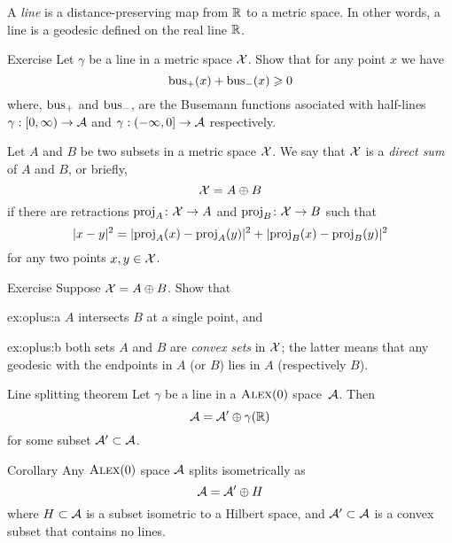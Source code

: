 A \emph{line} is a distance-preserving map
from $\RR$ to a metric space.
In other words, a line is a geodesic defined on the real line $\RR$.

\begin{thm}[!]{Exercise}\label{ex:bus+bus}
Let $\gamma$ be a line in a metric space $\spc{X}$.
Show that for any point $x$ we have
\[\bus_+(x)+\bus_-(x)\ge 0\]
where, $\bus_+$ and $\bus_-$, are the Busemann functions asociated with half-lines $\gamma:[0,\infty)\to \spc{A}$ and $\gamma:(-\infty,0]\to \spc{A}$ respectively.
\end{thm}


Let $A$ and $B$ be two subsets in a metric space $\spc{X}$.
We say that $\spc{X}$ is a \emph{direct sum} of $A$ and $B$,
or briefly,
\[\spc{X}=A\oplus B\]
if there are retractions $\proj_A\:\spc{X}\to A$
and 
$\proj_B\:\spc{X}\to B$
such that 
\[\dist[2]{x}{y}{}=\dist[2]{\proj_A(x)}{\proj_A(y)}{}+\dist[2]{\proj_B(x)}{\proj_B(y)}{}\]
for any two points $x,y\in \spc{X}$.

\begin{thm}{Exercise}\label{ex:oplus}
Suppose $\spc{X}=A\oplus B$.
Show that
\begin{subthm}{ex:oplus:a}
 $A$ intersects $B$ at a single point, and
\end{subthm}

\begin{subthm}{ex:oplus:b}
both sets $A$ and $B$ are \emph{convex sets} in $\spc{X}$;
the latter means that any geodesic with the endpoints in $A$ (or $B$) lies in $A$ (respectively $B$).
\end{subthm}

\end{thm}


\begin{thm}{Line splitting theorem}\label{thm:splitting}
Let $\gamma$ be a line in a $\Alex0$ space~$\spc{A}$. 
Then 
\[\spc{A}=\spc{A}'\oplus \gamma(\RR)\]
for some subset $\spc{A}'\subset \spc{A}$.
\end{thm}

\begin{thm}{Corollary}\label{cor:splitting}
Any $\Alex0$ space $\spc{A}$ splits isometrically as
\[
\spc{A}=\spc{A}'\oplus H
\]
where $H\subset \spc{A}$ is a subset isometric to a Hilbert space, and $\spc{A}'\subset \spc{A}$ is a convex subset that contains no lines. 
\end{thm}

